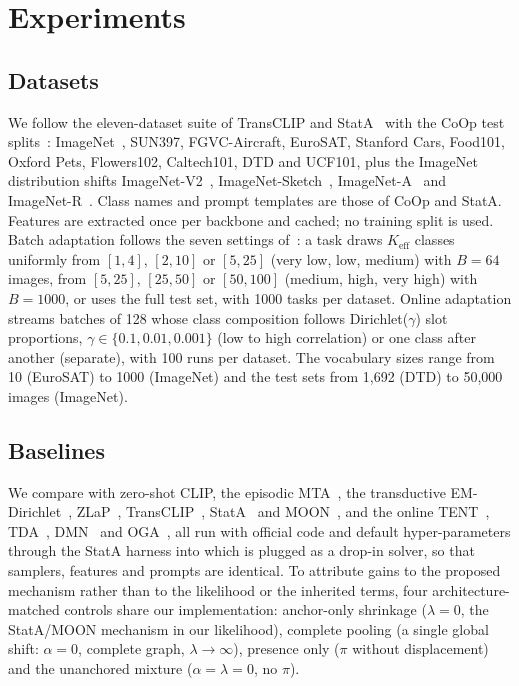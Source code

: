 \section{Experiments}
\label{sec:experiments}

\subsection{Datasets}
We follow the eleven-dataset suite of TransCLIP and StatA~\cite{zanella2024transclip,zanella2025stata} with the CoOp test splits~\cite{zhou2022coop}: ImageNet~\cite{deng2009imagenet}, SUN397, FGVC-Aircraft, EuroSAT, Stanford Cars, Food101, Oxford Pets, Flowers102, Caltech101, DTD and UCF101, plus the ImageNet distribution shifts ImageNet-V2~\cite{recht2019imagenetv2}, ImageNet-Sketch~\cite{wang2019sketch}, ImageNet-A~\cite{hendrycks2021imageneta} and ImageNet-R~\cite{hendrycks2021imagenetr}. Class names and prompt templates are those of CoOp and StatA. Features are extracted once per backbone and cached; no training split is used. Batch adaptation follows the seven settings of~\cite{zanella2025stata}: a task draws $K_{\mathrm{eff}}$ classes uniformly from $[1,4]$, $[2,10]$ or $[5,25]$ (very low, low, medium) with $B{=}64$ images, from $[5,25]$, $[25,50]$ or $[50,100]$ (medium, high, very high) with $B{=}1000$, or uses the full test set, with 1000 tasks per dataset. Online adaptation streams batches of 128 whose class composition follows Dirichlet($\gamma$) slot proportions, $\gamma\in\{0.1,0.01,0.001\}$ (low to high correlation) or one class after another (separate), with 100 runs per dataset. The vocabulary sizes range from 10 (EuroSAT) to 1000 (ImageNet) and the test sets from 1,692 (DTD) to 50,000 images (ImageNet).

\subsection{Baselines}
We compare with zero-shot CLIP, the episodic MTA~\cite{zanella2024mta}, the transductive EM-Dirichlet~\cite{martin2024transductive}, ZLaP~\cite{kalantidis2024zlap}, TransCLIP~\cite{zanella2024transclip}, StatA~\cite{zanella2025stata} and MOON~\cite{huang2026moon}, and the online TENT~\cite{wang2021tent}, TDA~\cite{karmanov2024tda}, DMN~\cite{zhang2024dmn} and OGA~\cite{fuchs2025oga}, all run with official code and default hyper-parameters through the StatA harness into which \method is plugged as a drop-in solver, so that samplers, features and prompts are identical. To attribute gains to the proposed mechanism rather than to the likelihood or the inherited terms, four architecture-matched controls share our implementation: anchor-only shrinkage ($\lambda{=}0$, the StatA/MOON mechanism in our likelihood), complete pooling (a single global shift: $\alpha{=}0$, complete graph, $\lambda\to\infty$), presence only ($\pi$ without displacement) and the unanchored mixture ($\alpha{=}\lambda{=}0$, no $\pi$).

